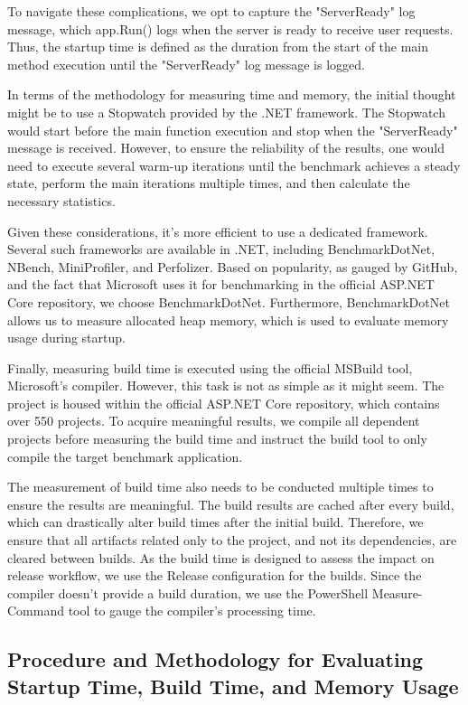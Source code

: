 To navigate these complications, we opt to capture the "ServerReady" log message, which app.Run() logs when the server is ready to receive user requests. Thus, the startup time is defined as the duration from the start of the main method execution until the "ServerReady" log message is logged.

In terms of the methodology for measuring time and memory, the initial thought might be to use a Stopwatch provided by the .NET framework. The Stopwatch would start before the main function execution and stop when the "ServerReady" message is received. However, to ensure the reliability of the results, one would need to execute several warm-up iterations until the benchmark achieves a steady state, perform the main iterations multiple times, and then calculate the necessary statistics.

Given these considerations, it's more efficient to use a dedicated framework. Several such frameworks are available in .NET, including BenchmarkDotNet, NBench, MiniProfiler, and Perfolizer. Based on popularity, as gauged by GitHub, and the fact that Microsoft uses it for benchmarking in the official ASP.NET Core repository, we choose BenchmarkDotNet. Furthermore, BenchmarkDotNet allows us to measure allocated heap memory, which is used to evaluate memory usage during startup.

Finally, measuring build time is executed using the official MSBuild tool, Microsoft's compiler. However, this task is not as simple as it might seem. The project is housed within the official ASP.NET Core repository, which contains over 550 projects. To acquire meaningful results, we compile all dependent projects before measuring the build time and instruct the build tool to only compile the target benchmark application.

The measurement of build time also needs to be conducted multiple times to ensure the results are meaningful. The build results are cached after every build, which can drastically alter build times after the initial build. Therefore, we ensure that all artifacts related only to the project, and not its dependencies, are cleared between builds. As the build time is designed to assess the impact on release workflow, we use the Release configuration for the builds. Since the compiler doesn't provide a build duration, we use the PowerShell Measure-Command tool to gauge the compiler's processing time.

\subsection{Procedure and Methodology for Evaluating Startup Time, Build Time, and Memory Usage}

